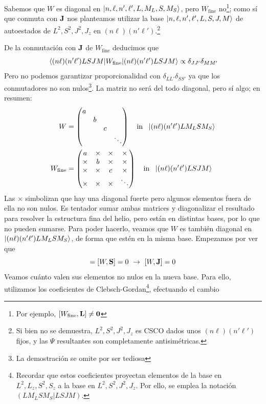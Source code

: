 Sabemos que $W$ es diagonal en $\ket{n,\ell,n',\ell',L,M_L,S,M_S}$, pero
$W_\text{fine}$ no\footnote{Por ejemplo,
  $[W_\text{fine},\bm{\mathrm{L}}]\neq \bm{\mathrm{0}}$}; como sí que conmuta con
$\bm{\mathrm{J}}$ nos planteamos utilizar la base
$\ket{n,\ell,n',\ell',L,S,J,M}$ de autoestados de $L^2,S^2,J^2,J_z$ en
$(n\ell)(n'\ell')$.\footnote{Si bien no se demuestra, $L^2,S^2,J^2,J_z$ es
  CSCO dados unos $(n\ell)(n'\ell')$ fijos, y las $\Psi$ resultantes son
  completamente antisimétricas.}

De la conmutación con $\bm{\mathrm{J}}$ de $W_\text{fine}$ deducimos que
\begin{equation}
  \ev{W_\text{fine}}{(n\ell)(n'\ell')LSJM} \propto \delta_{JJ'}\delta_{MM'}
  \label{eq:conmutationef}
\end{equation}
Pero no podemos garantizar proporcionalidad con $\delta_{LL'}\delta_{SS'}$ ya
que los conmutadores no son nulos\footnote{La demostración se omite
  por ser tediosa}. La matriz no será del todo diagonal, pero sí algo;
en resumen:
\begin{align}
  W &=
  \begin{pmatrix}
    a& & & \\
     &b& & \\
     & &c& \\
     & & &\ddots \\
  \end{pmatrix} \ \ \ \text{in}\ \  \ket{(n\ell)(n'\ell')LM_LSM_S}\\
  W_\text{fine} &=
  \begin{pmatrix}
    a&\times&\times&\times \\
    \times&b&\times&\times \\
    \times&\times&c&\times \\
    \times&\times&\times&\ddots \\
  \end{pmatrix} \ \ \ \text{in}\ \  \ket{(n\ell)(n'\ell')LSJM}
\end{align}
Las $\times$ simbolizan que hay una diagonal fuerte pero algunos elementos
fuera de ella no son nulos. Es tentador sumar ambas matrices y
diagonalizar el resultado para resolver la estructura fina del helio,
pero están en distintas bases, por lo que no pueden
sumarse. Para poder hacerlo, veamos que $W$
es también diagonal en $\ket{(n\ell)(n'\ell')LM_LSM_S}$, de forma que estén
en la misma base. Empezamos por ver que
\begin{equation}
  [W,\boldrm{L}]=[W,\boldrm{S}]=0 \ \rightarrow \ [W,\boldrm{J}]=0
\end{equation}
Veamos cuánto valen sus elementos no nulos en la nueva base. Para
ello, utilizamos los coeficientes de Clebsch-Gordan\footnote{Recordar
  que estos coeficientes proyectan elementos de la base en
  $L^2,L_z,S^2,S_z$ a la base en $L^2,S^2,J^2,J_z$. Por ello, se
  emplea la notación $(LM_LSM_S|LSJM)$.}, efectuando el cambio


